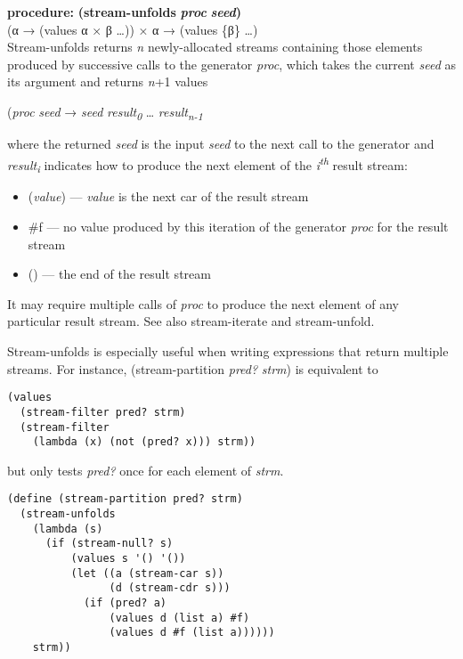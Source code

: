 \textbf{procedure:} \textbf{(stream-unfolds} \textbf{\emph{proc}}
\textbf{} \textbf{\emph{seed})}\\
(α → (values α × β \ldots{})) × α → (values \{β\} \ldots{})\\
Stream-unfolds returns \emph{n} newly-allocated streams containing those
elements produced by successive calls to the generator \emph{proc},
which takes the current \emph{seed} as its argument and returns
\emph{n}+1 values

(\emph{proc} \emph{seed} → \emph{seed}
\emph{result}\textsubscript{\emph{0}} \ldots{}
\emph{result}\textsubscript{\emph{n-1}}

where the returned \emph{seed} is the input \emph{seed} to the next call
to the generator and \emph{result}\textsubscript{\emph{i}} indicates how
to produce the next element of the \emph{i}\textsuperscript{\emph{th}}
result stream:

\begin{itemize}
\tightlist
\item
  (\emph{value}) --- \emph{value} is the next car of the result stream
\item
  \#f --- no value produced by this iteration of the generator
  \emph{proc} for the result stream
\item
  () --- the end of the result stream
\end{itemize}

It may require multiple calls of \emph{proc} to produce the next element
of any particular result stream. See also stream-iterate and
stream-unfold.

Stream-unfolds is especially useful when writing expressions that return
multiple streams. For instance, (stream-partition \emph{pred?}
\emph{strm}) is equivalent to

\begin{verbatim}
(values
  (stream-filter pred? strm)
  (stream-filter
    (lambda (x) (not (pred? x))) strm))
\end{verbatim}

but only tests \emph{pred?} once for each element of \emph{strm}.

\begin{verbatim}
(define (stream-partition pred? strm)
  (stream-unfolds
    (lambda (s)
      (if (stream-null? s)
          (values s '() '())
          (let ((a (stream-car s))
                (d (stream-cdr s)))
            (if (pred? a)
                (values d (list a) #f)
                (values d #f (list a))))))
    strm))
\end{verbatim}

